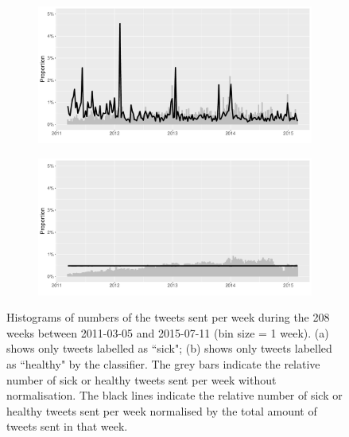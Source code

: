\documentclass[11pt, a4paper,twoside]{report}\usepackage[]{graphicx}\usepackage[]{color}
\begin{document}
\begin{figure}[htbp!]
\centering
  \begin{subfigure}[t]{1\textwidth}
  \includegraphics[width=1\linewidth]{12_activity_sick_date_Twitter_full_aggregatedoverlay.pdf}
  \caption{}
  \end{subfigure}
  
  \bigskip 

    \begin{subfigure}[t]{1\textwidth}
  \includegraphics[width=1\linewidth]{13_activity_healthy_date_Twitter_full_aggregatedoverlay.pdf}
  \caption{}
  \end{subfigure}
  \caption{Histograms of numbers of the tweets sent per week during the 208 weeks between 2011-03-05 and 2015-07-11 (bin size = 1 week). (a) shows only tweets labelled as ``sick"; (b) shows only tweets labelled as ``healthy" by the classifier. The grey bars indicate the relative number of sick or healthy tweets sent per week without normalisation. The black lines indicate the relative number of sick or healthy tweets sent per week normalised by the total amount of tweets sent in that week.}
  \label{fig:tweets_seasonal_healthy_sick}
\end{figure}
\end{document}
